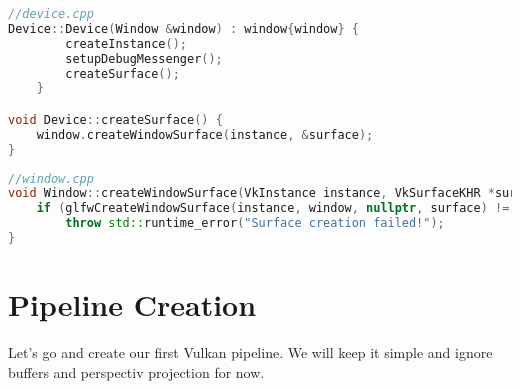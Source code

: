 \documentclass[12pt]{report} \usepackage{preamble}
\begin{document}
\begin{lstlisting}[language=C++]
//device.cpp
Device::Device(Window &window) : window{window} {
		createInstance();
		setupDebugMessenger();
		createSurface();
	}

void Device::createSurface() {
	window.createWindowSurface(instance, &surface);
}
\end{lstlisting}

\begin{lstlisting}[language=C++]
//window.cpp
void Window::createWindowSurface(VkInstance instance, VkSurfaceKHR *surface) {
	if (glfwCreateWindowSurface(instance, window, nullptr, surface) != VK_SUCCESS)
		throw std::runtime_error("Surface creation failed!");
}
\end{lstlisting}

\section{Pipeline Creation}

Let's go and create our first Vulkan pipeline. We will keep it simple and ignore
buffers and perspectiv projection for now.


\printbibliography[
	heading=bibintoc, title={Bibliography}
]

\listoffigures
\end{document}
